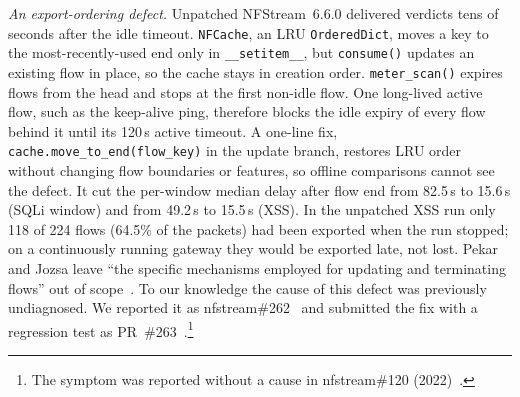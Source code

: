 \emph{An export-ordering defect.} Unpatched NFStream~6.6.0 delivered verdicts tens of seconds after the idle timeout. \texttt{NFCache}, an LRU \texttt{OrderedDict}, moves a key to the most-recently-used end only in \texttt{\_\_setitem\_\_}, but \texttt{consume()} updates an existing flow in place, so the cache stays in creation order. \texttt{meter\_scan()} expires flows from the head and stops at the first non-idle flow. One long-lived active flow, such as the keep-alive ping, therefore blocks the idle expiry of every flow behind it until its 120\,s active timeout. A one-line fix, \texttt{cache.move\_to\_end(flow\_key)} in the update branch, restores LRU order without changing flow boundaries or features, so offline comparisons cannot see the defect. It cut the per-window median delay after flow end from 82.5\,s to 15.6\,s (SQLi window) and from 49.2\,s to 15.5\,s (XSS). In the unpatched XSS run only 118 of 224 flows (64.5\% of the packets) had been exported when the run stopped; on a continuously running gateway they would be exported late, not lost. Pekar and Jozsa leave ``the specific mechanisms employed for updating and terminating flows'' out of scope~\cite{pekar2024integrity}. To our knowledge the cause of this defect was previously undiagnosed. We reported it as nfstream\#262~\cite{nfstream262} and submitted the fix with a regression test as PR~\#263~\cite{nfstream263}.\footnote{The symptom was reported without a cause in nfstream\#120 (2022)~\cite{nfstream120}.}
